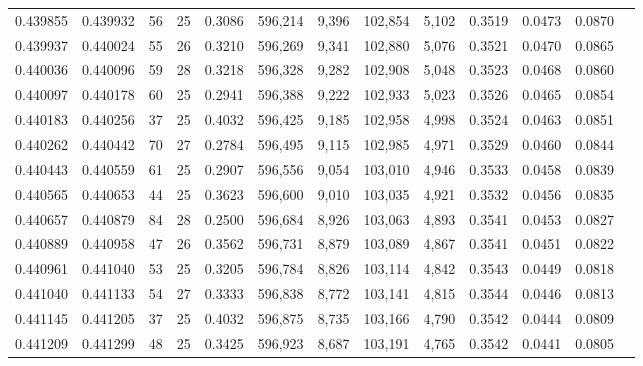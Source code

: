 \begin{tabular}{rrrrrrrrrrrrr}
0.439855 & 0.439932 &    56 &  25 &                                     0.3086 & 596,214 &   9,396 & 102,854 &   5,102 & 0.3519 & 0.0473 & 0.0870 \\
0.439937 & 0.440024 &    55 &  26 &                                     0.3210 & 596,269 &   9,341 & 102,880 &   5,076 & 0.3521 & 0.0470 & 0.0865 \\
0.440036 & 0.440096 &    59 &  28 &                                     0.3218 & 596,328 &   9,282 & 102,908 &   5,048 & 0.3523 & 0.0468 & 0.0860 \\
0.440097 & 0.440178 &    60 &  25 &                                     0.2941 & 596,388 &   9,222 & 102,933 &   5,023 & 0.3526 & 0.0465 & 0.0854 \\
0.440183 & 0.440256 &    37 &  25 &                                     0.4032 & 596,425 &   9,185 & 102,958 &   4,998 & 0.3524 & 0.0463 & 0.0851 \\
0.440262 & 0.440442 &    70 &  27 &                                     0.2784 & 596,495 &   9,115 & 102,985 &   4,971 & 0.3529 & 0.0460 & 0.0844 \\
0.440443 & 0.440559 &    61 &  25 &                                     0.2907 & 596,556 &   9,054 & 103,010 &   4,946 & 0.3533 & 0.0458 & 0.0839 \\
0.440565 & 0.440653 &    44 &  25 &                                     0.3623 & 596,600 &   9,010 & 103,035 &   4,921 & 0.3532 & 0.0456 & 0.0835 \\
0.440657 & 0.440879 &    84 &  28 &                                     0.2500 & 596,684 &   8,926 & 103,063 &   4,893 & 0.3541 & 0.0453 & 0.0827 \\
0.440889 & 0.440958 &    47 &  26 &                                     0.3562 & 596,731 &   8,879 & 103,089 &   4,867 & 0.3541 & 0.0451 & 0.0822 \\
0.440961 & 0.441040 &    53 &  25 &                                     0.3205 & 596,784 &   8,826 & 103,114 &   4,842 & 0.3543 & 0.0449 & 0.0818 \\
0.441040 & 0.441133 &    54 &  27 &                                     0.3333 & 596,838 &   8,772 & 103,141 &   4,815 & 0.3544 & 0.0446 & 0.0813 \\
0.441145 & 0.441205 &    37 &  25 &                                     0.4032 & 596,875 &   8,735 & 103,166 &   4,790 & 0.3542 & 0.0444 & 0.0809 \\
0.441209 & 0.441299 &    48 &  25 &                                     0.3425 & 596,923 &   8,687 & 103,191 &   4,765 & 0.3542 & 0.0441 & 0.0805 \\

\end{tabular}
